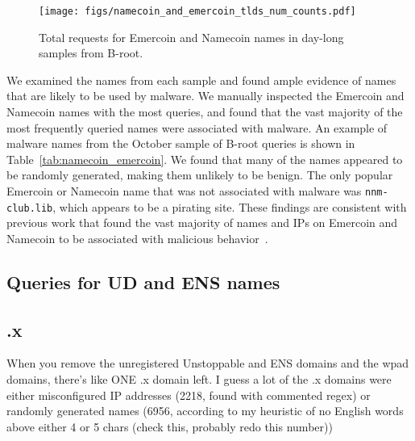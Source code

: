 \begin{figure}[t]
	\centering
	\texttt{[image: figs/namecoin\_and\_emercoin\_tlds\_num\_counts.pdf]}
	\caption{Total requests for Emercoin and Namecoin names in day-long samples 
		from B-root.}
	\label{fig:namecoin_and_emercoin_counts}
\end{figure}

 We examined the names from each sample 
and found ample evidence of names that are likely to be used by malware. We 
manually inspected 
the Emercoin and Namecoin names with the most queries, and found that the vast 
majority of the most 
frequently queried names were associated with malware. An example of malware 
names from the October 
sample of B-root queries is shown in Table~\ref{tab:namecoin_emercoin}. We 
found that many of the 
names appeared to be randomly generated, making them unlikely to be benign. 
 The only popular Emercoin 
or Namecoin name that was not associated with malware was 
\texttt{nnm-club.lib}, which appears to be a 
pirating site. These findings are consistent with previous work that found the 
vast majority of names 
and IPs on Emercoin and Namecoin to be associated with malicious 
behavior~\cite{patsakis_unravelling_2020, casino_unearthing_2021}. 

\subsection{Queries for UD and ENS names}

	
\subsection{.x}

When you remove the unregistered Unstoppable and ENS domains and the wpad 
domains, there’s like ONE .x domain left. I guess a lot of the .x domains were 
either misconfigured IP addresses (2218, found with 
commented regex) or randomly generated names (6956, according to my heuristic 
of no English words above either 4 or 5 chars (check this, probably redo this 
number)) %

